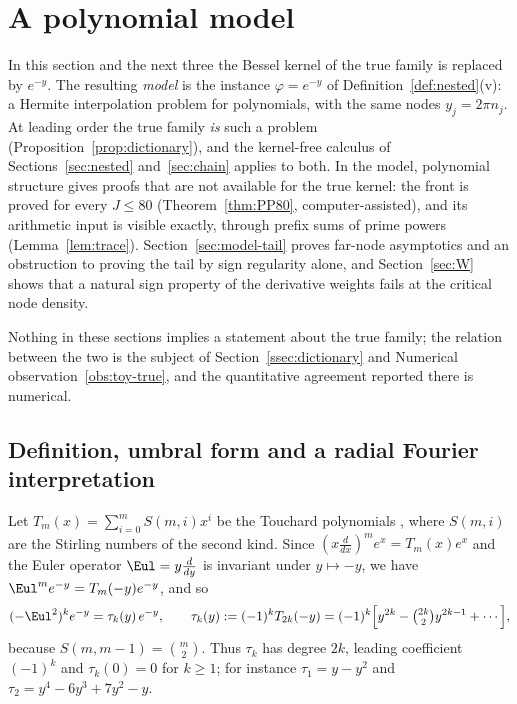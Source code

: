 \section{A polynomial model}\label{sec:toy}\label{sec:model}

In this section and the next three the Bessel kernel of the true family is replaced by $e^{-y}$. The resulting
\emph{model} is the instance $\varphi=e^{-y}$ of Definition~\ref{def:nested}(v): a Hermite interpolation problem for
polynomials, with the same nodes $y_j=2\pi n_j$. At leading order the true family \emph{is} such a problem
(Proposition~\ref{prop:dictionary}), and the kernel-free calculus of Sections~\ref{sec:nested} and~\ref{sec:chain} applies to
both. In the model, polynomial structure gives proofs that are not available for the true kernel: the front is proved for
every $J\le 80$ (Theorem~\ref{thm:PP80}, computer-assisted), and its arithmetic input is visible exactly, through prefix
sums of prime powers (Lemma~\ref{lem:trace}). Section~\ref{sec:model-tail} proves far-node asymptotics and an obstruction
to proving the tail by sign regularity alone, and Section~\ref{sec:W} shows that a natural sign property of the derivative
weights fails at the critical node density.

Nothing in these sections implies a statement about the true family; the relation between the two is the subject of
Section~\ref{ssec:dictionary} and Numerical observation~\ref{obs:toy-true}, and the quantitative agreement reported there is
numerical.

\subsection{Definition, umbral form and a radial Fourier interpretation}\label{ssec:toy-def}

Let $T_m(x)=\sum_{i=0}^m S(m,i)x^i$ be the Touchard polynomials \cite{Tou39,Com74}, where $S(m,i)$ are the Stirling
numbers of the second kind. Since $(x\frac{d}{dx})^m e^{x}=T_m(x)e^{x}$ and the Euler operator $\Eul=y\frac{d}{dy}$ is
invariant under $y\mapsto -y$, we have $\Eul^{m}e^{-y}=T_m(-y)e^{-y}$, and so
\begin{equation}\label{eq:tau}
  (-\Eul^2)^k e^{-y}=\tau_k(y)\,e^{-y},\qquad \tau_k(y):=(-1)^kT_{2k}(-y)=(-1)^k\Bigl[y^{2k}-\tbinom{2k}{2}y^{2k-1}+\cdots\Bigr],
\end{equation}
because $S(m,m-1)=\binom m2$. Thus $\tau_k$ has degree $2k$, leading coefficient $(-1)^k$ and $\tau_k(0)=0$ for
$k\ge1$; for instance $\tau_1=y-y^2$ and $\tau_2=y^4-6y^3+7y^2-y$.

